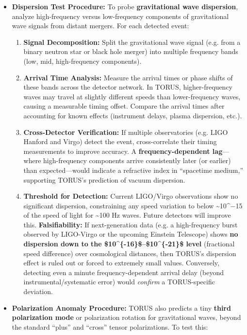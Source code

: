 \documentclass[
]{article}
\begin{document}
\begin{itemize}
\item
  \textbf{Dispersion Test Procedure:} To probe \textbf{gravitational
  wave dispersion}, analyze high-frequency versus low-frequency
  components of gravitational wave signals from distant mergers. For
  each detected event:

  \begin{enumerate}
  \def\labelenumi{\arabic{enumi}.}
  \item
    \textbf{Signal Decomposition:} Split the gravitational wave signal
    (e.g. from a binary neutron star or black hole merger) into multiple
    frequency bands (low, mid, high-frequency components).
  \item
    \textbf{Arrival Time Analysis:} Measure the arrival times or phase
    shifts of these bands across the detector network. In TORUS,
    higher-frequency waves may travel at slightly different speeds than
    lower-frequency waves, causing a measurable timing
    offset\hspace{0pt}. Compare the arrival times after accounting for
    known effects (instrument delays, plasma dispersion, etc.).
  \item
    \textbf{Cross-Detector Verification:} If multiple observatories
    (e.g. LIGO Hanford and Virgo) detect the event, cross-correlate
    their timing measurements to improve accuracy. A
    \textbf{frequency-dependent lag}---where high-frequency components
    arrive consistently later (or earlier) than expected---would
    indicate a refractive index in ``spacetime medium,'' supporting
    TORUS's prediction of vacuum dispersion\hspace{0pt}.
  \item
    \textbf{Threshold for Detection:} Current LIGO/Virgo observations
    show no significant dispersion, constraining any speed variation to
    below \textasciitilde10\^{}−15 of the speed of light for
    \textasciitilde100 Hz waves. Future detectors will improve this.
    \textbf{Falsifiability:} If next-generation data (e.g. a
    high-frequency burst observed by LIGO-Virgo or the upcoming Einstein
    Telescope) shows \textbf{no dispersion down to the
    \$10\^{}\{-16\}\$--\$10\^{}\{-21\}\$ level} (fractional speed
    difference) over cosmological distances, then TORUS's dispersion
    effect is ruled out or forced to extremely small values\hspace{0pt}.
    Conversely, detecting even a minute frequency-dependent arrival
    delay (beyond instrumental/systematic error) would \emph{confirm} a
    TORUS-specific deviation.
  \end{enumerate}
\item
  \textbf{Polarization Anomaly Procedure:} TORUS also predicts a tiny
  \textbf{third polarization mode} or polarization rotation for
  gravitational waves, beyond the standard ``plus'' and ``cross'' tensor
  polarizations\hspace{0pt}. To test this:


\end{itemize}
\end{document}
